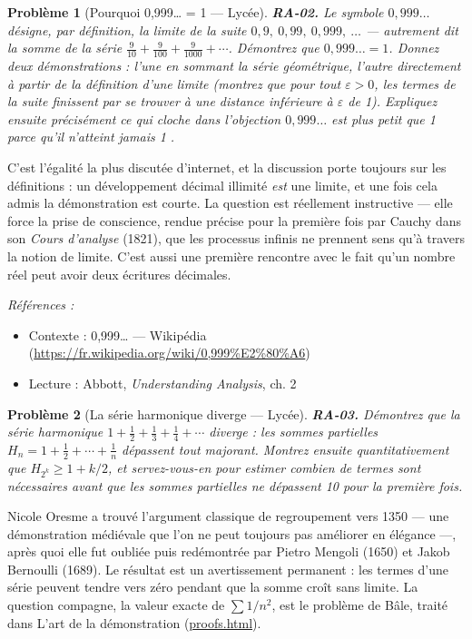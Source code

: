 \documentclass[11pt]{article}
\newtheorem{problem}{Problème}
\newenvironment{refs}{\par\small\noindent\emph{Références :}\begin{itemize}\setlength\itemsep{0pt}}{\end{itemize}\normalsize}
\begin{document}
\bigskip

\begin{problem}[{Pourquoi 0,999\dots{} = 1 --- Lycée}]
\textbf{RA-02.} Le symbole $ 0{,}999\ldots $ désigne, par définition, la
limite de la suite $ 0{,}9,\ 0{,}99,\ 0{,}999,\ \dots $ --- autrement dit la somme de la série
$ \frac{9}{10} + \frac{9}{100} + \frac{9}{1000} + \cdots $. Démontrez que
$ 0{,}999\ldots = 1 $. Donnez deux démonstrations : l'une en sommant la série géométrique, l'autre
directement à partir de la définition d'une limite (montrez que pour tout $ \varepsilon > 0 $,
les termes de la suite finissent par se trouver à une distance inférieure à $ \varepsilon $ de 1).
Expliquez ensuite précisément ce qui cloche dans l'objection \og{} $ 0{,}999\ldots $ est plus petit que
1 parce qu'il n'atteint jamais 1 \fg{}.
\end{problem}

\noindent C'est l'égalité la plus discutée d'internet, et la discussion porte toujours sur
les définitions : un développement décimal illimité \textit{est} une limite, et une fois cela admis
la démonstration est courte. La question est réellement instructive --- elle force la prise de
conscience, rendue précise pour la première fois par Cauchy dans son \textit{Cours d'analyse} (1821),
que les processus infinis ne prennent sens qu'à travers la notion de limite. C'est aussi une
première rencontre avec le fait qu'un nombre réel peut avoir deux écritures décimales.

\begin{refs}
\item Contexte : 0,999\dots{} --- Wikipédia (\url{https://fr.wikipedia.org/wiki/0,999%E2%80%A6})
\item Lecture : Abbott, \textit{Understanding Analysis}, ch. 2
\end{refs}

\bigskip

\begin{problem}[{La série harmonique diverge --- Lycée}]
\textbf{RA-03.} Démontrez que la série harmonique
$ 1 + \frac{1}{2} + \frac{1}{3} + \frac{1}{4} + \cdots $ diverge : les sommes partielles
$ H_n = 1 + \frac{1}{2} + \cdots + \frac{1}{n} $ dépassent tout majorant. Montrez ensuite
quantitativement que $ H_{2^k} \ge 1 + k/2 $, et servez-vous-en pour estimer combien de termes
sont nécessaires avant que les sommes partielles ne dépassent 10 pour la première fois.
\end{problem}

\noindent Nicole Oresme a trouvé l'argument classique de regroupement vers 1350 --- une
démonstration médiévale que l'on ne peut toujours pas améliorer en élégance ---, après quoi elle fut
oubliée puis redémontrée par Pietro Mengoli (1650) et Jakob Bernoulli (1689). Le résultat est un
avertissement permanent : les termes d'une série peuvent tendre vers zéro pendant que la somme
croît sans limite. La question compagne, la valeur exacte de $ \sum 1/n^2 $, est le problème de
Bâle, traité dans L'art de la démonstration (\url{proofs.html}).
\end{document}
